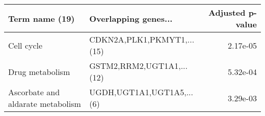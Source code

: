 \begin{tabular}{llr}
\toprule
                   Term name (19) &       Overlapping genes... &  Adjusted p-value \\
\midrule
                       Cell cycle & CDKN2A,PLK1,PKMYT1,...(15) &          2.17e-05 \\
                  Drug metabolism &  GSTM2,RRM2,UGT1A1,...(12) &          5.32e-04 \\
Ascorbate and aldarate metabolism &  UGDH,UGT1A1,UGT1A5,...(6) &          3.29e-03 \\
\bottomrule
\end{tabular}
